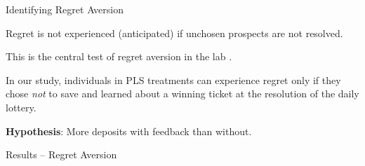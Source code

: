 \documentclass[aspectratio=169]{beamer}
\newenvironment{wideitemize}{\itemize\addtolength{\itemsep}{10pt}}{\enditemize}
\begin{document}
\begin{frame}{Identifying Regret Aversion}

	\begin{wideitemize}

		\item Regret is not experienced (anticipated) if unchosen prospects are not resolved.

		\item This is the central test of regret aversion in the lab \parencite{filiz-ozbay_auctions_2007,zeelenberg_consequences_2004,zeelenberg_consequences_1996}.

		\item In our study, individuals in PLS treatments can experience regret only if they chose \textit{not} to save and learned about a winning ticket at the resolution of the daily lottery.


		\item \textbf{Hypothesis}: More deposits with feedback than without.

	\end{wideitemize}

	
\end{frame}

\begin{frame}{Results -- Regret Aversion}

	

\end{frame}
\end{document}
